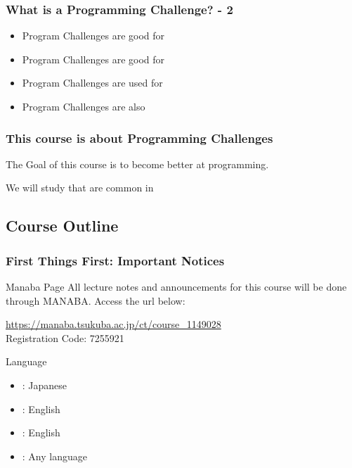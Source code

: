 \documentclass{beamer}
\begin{document}
\begin{frame}
  \frametitle{What is a Programming Challenge? - 2}

  \begin{itemize}
    \item Program Challenges are good for 
    \bigskip

    \item Program Challenges are good for 
    \bigskip

    \item Program Challenges are used for 
    \bigskip

    \item Program Challenges are also 
  \end{itemize}
\end{frame}

\begin{frame}
  \frametitle{This course is about Programming Challenges}

  The Goal of this course is  to \alert{become better at programming}.

  \vfill

  We will study  that are common in
\end{frame}

\subsection{Course Outline}
\begin{frame}
  \frametitle{First Things First: Important Notices}

  \begin{block}{Manaba Page}
    All lecture notes and announcements for this course will be done
    through MANABA. Access the url below:

    \medskip

    \url{https://manaba.tsukuba.ac.jp/ct/course_1149028}\\
    Registration Code: 7255921
  \end{block}
  \begin{exampleblock}{Language}
    \begin{itemize}
      \item {}: Japanese
      \item {}: English
      \item {}: English
      \item {}: Any language
    \end{itemize}
  \end{exampleblock}
\end{frame}
\end{document}
